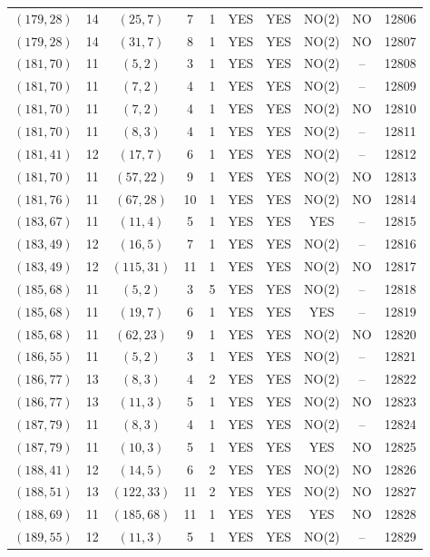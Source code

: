 \begin{longtable}{|c|c|c|c|c|c|c|c|c|c|}
$(179, 28)$ & 14 & $(25, 7)$ & 7 & 1 & YES & YES & NO(2) & NO & 12806\\
$(179, 28)$ & 14 & $(31, 7)$ & 8 & 1 & YES & YES & NO(2) & NO & 12807\\
$(181, 70)$ & 11 & $(5, 2)$ & 3 & 1 & YES & YES & NO(2) & -- & 12808\\
$(181, 70)$ & 11 & $(7, 2)$ & 4 & 1 & YES & YES & NO(2) & -- & 12809\\
$(181, 70)$ & 11 & $(7, 2)$ & 4 & 1 & YES & YES & NO(2) & NO & 12810\\
$(181, 70)$ & 11 & $(8, 3)$ & 4 & 1 & YES & YES & NO(2) & -- & 12811\\
$(181, 41)$ & 12 & $(17, 7)$ & 6 & 1 & YES & YES & NO(2) & -- & 12812\\
$(181, 70)$ & 11 & $(57, 22)$ & 9 & 1 & YES & YES & NO(2) & NO & 12813\\
$(181, 76)$ & 11 & $(67, 28)$ & 10 & 1 & YES & YES & NO(2) & NO & 12814\\
$(183, 67)$ & 11 & $(11, 4)$ & 5 & 1 & YES & YES & YES & -- & 12815\\
$(183, 49)$ & 12 & $(16, 5)$ & 7 & 1 & YES & YES & NO(2) & -- & 12816\\
$(183, 49)$ & 12 & $(115, 31)$ & 11 & 1 & YES & YES & NO(2) & NO & 12817\\
$(185, 68)$ & 11 & $(5, 2)$ & 3 & 5 & YES & YES & NO(2) & -- & 12818\\
$(185, 68)$ & 11 & $(19, 7)$ & 6 & 1 & YES & YES & YES & -- & 12819\\
$(185, 68)$ & 11 & $(62, 23)$ & 9 & 1 & YES & YES & NO(2) & NO & 12820\\
$(186, 55)$ & 11 & $(5, 2)$ & 3 & 1 & YES & YES & NO(2) & -- & 12821\\
$(186, 77)$ & 13 & $(8, 3)$ & 4 & 2 & YES & YES & NO(2) & -- & 12822\\
$(186, 77)$ & 13 & $(11, 3)$ & 5 & 1 & YES & YES & NO(2) & NO & 12823\\
$(187, 79)$ & 11 & $(8, 3)$ & 4 & 1 & YES & YES & NO(2) & -- & 12824\\
$(187, 79)$ & 11 & $(10, 3)$ & 5 & 1 & YES & YES & YES & NO & 12825\\
$(188, 41)$ & 12 & $(14, 5)$ & 6 & 2 & YES & YES & NO(2) & NO & 12826\\
$(188, 51)$ & 13 & $(122, 33)$ & 11 & 2 & YES & YES & NO(2) & NO & 12827\\
$(188, 69)$ & 11 & $(185, 68)$ & 11 & 1 & YES & YES & YES & NO & 12828\\
$(189, 55)$ & 12 & $(11, 3)$ & 5 & 1 & YES & YES & NO(2) & -- & 12829\\

\end{longtable}
